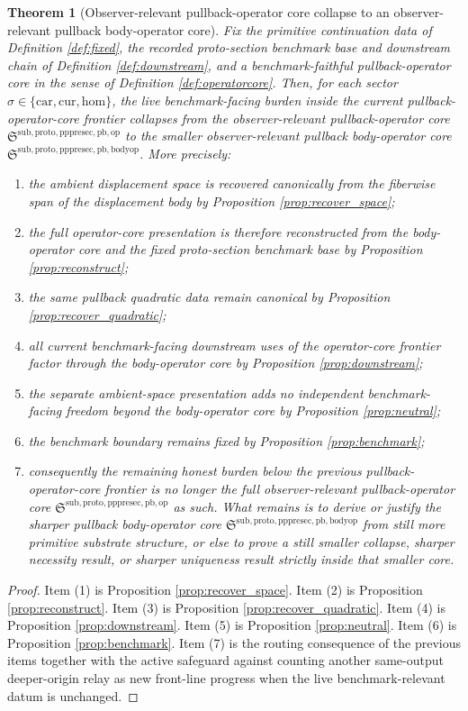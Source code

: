 \documentclass[11pt]{article}
\newcommand{\Car}{\mathrm{car}}
\newcommand{\Cur}{\mathrm{cur}}
\newcommand{\Hom}{\mathrm{hom}}
\newcommand{\PullbackOperatorCore}{\mathfrak S^{\mathrm{sub,proto,pppresec,pb,op}}}
\newcommand{\PullbackBodyOperatorCore}{\mathfrak S^{\mathrm{sub,proto,pppresec,pb,bodyop}}}
\newtheorem{theorem}{Theorem}
\begin{document}
\begin{theorem}[Observer-relevant pullback-operator core collapse to an observer-relevant pullback body-operator core]
\label{thm:main}
Fix the primitive continuation data of Definition \ref{def:fixed}, the recorded proto-section benchmark base and downstream chain of Definition \ref{def:downstream}, and a benchmark-faithful pullback-operator core in the sense of Definition \ref{def:operatorcore}. Then, for each sector \(\sigma\in\{\Car,\Cur,\Hom\}\), the live benchmark-facing burden inside the current pullback-operator-core frontier collapses from the observer-relevant pullback-operator core \(\PullbackOperatorCore\) to the smaller observer-relevant pullback body-operator core \(\PullbackBodyOperatorCore\). More precisely:
\begin{enumerate}
    \item the ambient displacement space is recovered canonically from the fiberwise span of the displacement body by Proposition \ref{prop:recover_space};
    \item the full operator-core presentation is therefore reconstructed from the body-operator core and the fixed proto-section benchmark base by Proposition \ref{prop:reconstruct};
    \item the same pullback quadratic data remain canonical by Proposition \ref{prop:recover_quadratic};
    \item all current benchmark-facing downstream uses of the operator-core frontier factor through the body-operator core by Proposition \ref{prop:downstream};
    \item the separate ambient-space presentation adds no independent benchmark-facing freedom beyond the body-operator core by Proposition \ref{prop:neutral};
    \item the benchmark boundary remains fixed by Proposition \ref{prop:benchmark};
    \item consequently the remaining honest burden below the previous pullback-operator-core frontier is no longer the full observer-relevant pullback-operator core \(\PullbackOperatorCore\) as such. What remains is to derive or justify the sharper pullback body-operator core \(\PullbackBodyOperatorCore\) from still more primitive substrate structure, or else to prove a still smaller collapse, sharper necessity result, or sharper uniqueness result strictly inside that smaller core.
\end{enumerate}
\end{theorem}

\begin{proof}
Item (1) is Proposition \ref{prop:recover_space}. Item (2) is Proposition \ref{prop:reconstruct}. Item (3) is Proposition \ref{prop:recover_quadratic}. Item (4) is Proposition \ref{prop:downstream}. Item (5) is Proposition \ref{prop:neutral}. Item (6) is Proposition \ref{prop:benchmark}. Item (7) is the routing consequence of the previous items together with the active safeguard against counting another same-output deeper-origin relay as new front-line progress when the live benchmark-relevant datum is unchanged.
\end{proof}
\end{document}
